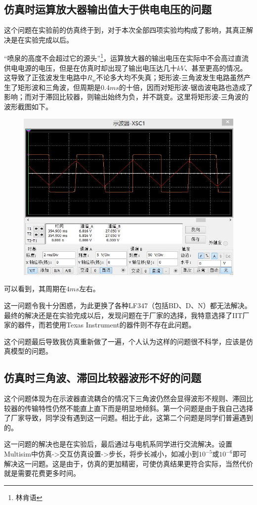 \documentclass[12pt,a4paper]{article}
\begin{document}
\begin{spacing}{1.3}
\subsection{仿真时运算放大器输出值大于供电电压的问题}
这个问题在实验前的仿真终于到，对于本次全部四项实验均构成了影响，其真正解决是在实验完成以后。\par
“喷泉的高度不会超过它的源头”\footnote{林肯语}，运算放大器的输出电压在实际中不会高过直流供电电源的电压，但是在仿真时却出现了输出电压达几十$kV$、甚至更高的情况。这导致了正弦波发生电路中$R_w$不论多大均不失真；矩形波-三角波发生电路虽然产生了矩形波和三角波，但周期是$0.4ms$的十倍，因而对矩形波-锯齿波电路也造成了影响；而对于滞回比较器，则输出始终为负，并不跳变。这里将矩形波-三角波的波形截图如下。
\begin{figure}[H]
\centering
\includegraphics[width=\textwidth]{9.jpg}
\end{figure}
可以看到，其周期在$4ms$左右。\par
这一问题令我十分困惑，为此更换了各种LF347（包括BD、D、N）都无法解决。最终的解决还是在实验完成以后，发现问题在于厂家的选择，我特意选择了IIT厂家的器件，而若使用Texas Instrument的器件则不存在此问题。\par
这个问题最后导致我仿真重新做了一遍，个人认为这样的问题很不科学，应该是仿真模型的问题。
\subsection{仿真时三角波、滞回比较器波形不好的问题}
这个问题体现为在示波器直流耦合的情况下三角波仍然会显得波形不规则、滞回比较器的传输特性仍然不能直上直下而是明显地倾斜。第一个问题是由于我自己选择了厂家导致，同学没有遇到这一问题。相比于此，这第二个问题是同学们普遍遇到的。\par
这一问题的解决也是在实验后，最后通过与电机系同学进行交流解决。设置Multisim中仿真->交互仿真设置->步长，将步长减小，如减小到$10^{-5}或10^{-6}$即可解决这一问题。这是由于，仿真的更加精密，可使仿真结果更符合实际，当然代价就是需要花费更多时间。

\end{spacing}
\end{document}
